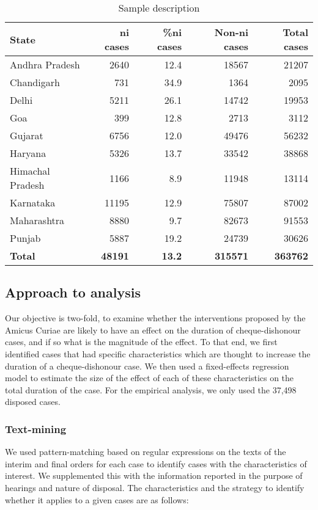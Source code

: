 {\footnotesize \begin{longtable}{@{}lrrrr@{}}
\caption{Sample description}
\label{tab:sample_desc}\\
\toprule
\textbf{State} & \textbf{\gls{ni} cases} & \textbf{\%\gls{ni} cases} & \textbf{Non-\gls{ni} cases} & \textbf{Total cases}\\ \midrule
\endhead
Andhra Pradesh & 2640 & 12.4 & 18567 & 21207\\
Chandigarh & 731 & 34.9 & 1364 & 2095\\
Delhi & 5211 & 26.1 & 14742 & 19953\\
Goa & 399 & 12.8 & 2713 & 3112\\
Gujarat & 6756 & 12.0 & 49476 & 56232\\
Haryana & 5326 & 13.7 & 33542 & 38868\\
Himachal Pradesh & 1166 & 8.9 & 11948 & 13114\\
Karnataka & 11195 & 12.9 & 75807 & 87002\\
Maharashtra & 8880 & 9.7 & 82673 & 91553\\
Punjab & 5887 & 19.2 & 24739 & 30626\\
\textbf{Total} & \textbf{48191} & \textbf{13.2} & \textbf{315571} & \textbf{363762}\\ \bottomrule
\end{longtable}
}

\subsection{Approach to analysis}
\label{sec:approach-analysis}

Our objective is two-fold, to examine whether the interventions proposed by the Amicus Curiae are likely to have an effect on the duration of cheque-dishonour cases, and if so what is the magnitude of the effect. To that end, we first identified cases that had specific characteristics which are thought to increase the duration of a cheque-dishonour case. We then used a fixed-effects regression model to estimate the size of the effect of each of these characteristics on the total duration of the case. For the empirical analysis, we only used the 37,498 disposed cases.

\subsubsection{Text-mining}
\label{sec:text-mining}

We used pattern-matching based on regular expressions on the texts of
the interim and final orders for each case to identify cases with the
characteristics of interest. We supplemented this with the information
reported in the purpose of hearings and nature of disposal. The
characteristics and the strategy to identify whether it applies to a
given cases are as follows:

